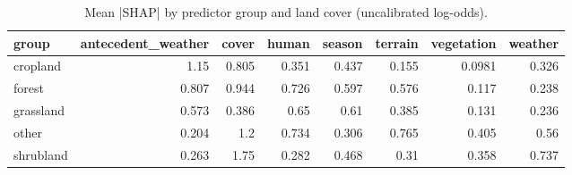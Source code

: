\begin{table}
\caption{Mean |SHAP| by predictor group and land cover (uncalibrated log-odds).}
\label{tab:T12_shap_groups_landcover}
\begin{tabular}{lrrrrrrr}
\toprule
group & antecedent_weather & cover & human & season & terrain & vegetation & weather \\
\midrule
cropland & 1.15 & 0.805 & 0.351 & 0.437 & 0.155 & 0.0981 & 0.326 \\
forest & 0.807 & 0.944 & 0.726 & 0.597 & 0.576 & 0.117 & 0.238 \\
grassland & 0.573 & 0.386 & 0.65 & 0.61 & 0.385 & 0.131 & 0.236 \\
other & 0.204 & 1.2 & 0.734 & 0.306 & 0.765 & 0.405 & 0.56 \\
shrubland & 0.263 & 1.75 & 0.282 & 0.468 & 0.31 & 0.358 & 0.737 \\
\bottomrule
\end{tabular}
\end{table}
